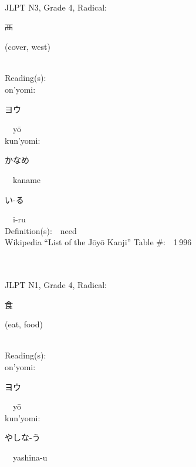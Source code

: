\begin{multicols}{2}
{JLPT N3, Grade 4, Radical:\ \ {\begin{CJK}{UTF8}{min} 襾 \end{CJK}} (cover, west) } \\
Reading(s):\ \ \\
{\hspace*{1em}}on'yomi:\ \ \\
{\hspace*{2em}}{\begin{CJK}{UTF8}{min} ヨウ \end{CJK}}\ \ y\=o\ \ \\
{\hspace*{1em}}kun'yomi:\ \ \\
{\hspace*{2em}}{\begin{CJK}{UTF8}{min} かなめ \end{CJK}}\ \ kaname\ \ \\
{\hspace*{2em}}{\begin{CJK}{UTF8}{min} い-る \end{CJK}}\ \ i-ru\ \ \\
Definition(s):\ \ need \\
Wikipedia ``List of the J\=oy\=o Kanji'' Table \#:\ \ 1\,996 \\
\ \ \\
{\fontsize{34pt}{40pt}  }\ \ \\  %
{JLPT N1, Grade 4, Radical:\ \ {\begin{CJK}{UTF8}{min} 食 \end{CJK}} (eat, food) } \\
Reading(s):\ \ \\
{\hspace*{1em}}on'yomi:\ \ \\
{\hspace*{2em}}{\begin{CJK}{UTF8}{min} ヨウ \end{CJK}}\ \ y\=o\ \ \\
{\hspace*{1em}}kun'yomi:\ \ \\
{\hspace*{2em}}{\begin{CJK}{UTF8}{min} やしな-う \end{CJK}}\ \ yashina-u\ \ \\

\end{multicols}
